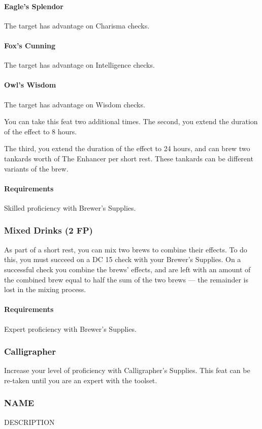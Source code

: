     \paragraph{Eagle's Splendor} The target has advantage on Charisma checks.
    \paragraph{Fox's Cunning} The target has advantage on Intelligence checks.
    \paragraph{Owl's Wisdom} The target has advantage on Wisdom checks.

    You can take this feat two additional times.
    The second, you extend the duration of the effect to 8 hours.

    The third, you extend the duration of the effect to 24 hours, and can brew two tankards worth of The Enhancer per short rest.
    These tankards can be different variants of the brew.
    \paragraph{Requirements} Skilled proficiency with Brewer's Supplies.
\subsubsection{Mixed Drinks (2 FP)} \label{feat::mixeddrinks}
    As part of a short rest, you can mix two brews to combine their effects.
    To do this, you must succeed on a DC 15 check with your Brewer's Supplies.
    On a successful check you combine the brews' effects, and are left with an amount of the combined brew equal to half the sum of the two brews --- the remainder is lost in the mixing process.
    \paragraph{Requirements} Expert proficiency with Brewer's Supplies.
\subsubsection{Calligrapher} \label{feat::calligrapher}
    Increase your level of proficiency with Calligrapher's Supplies.
    This feat can be re-taken until you are an expert with the toolset.
\subsubsection{NAME} \label{feat::name}
    DESCRIPTION
